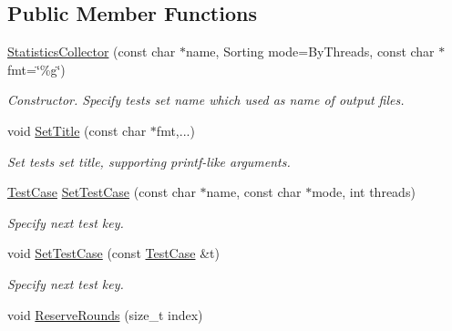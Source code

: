 \subsection*{Public Member Functions}
\begin{DoxyCompactItemize}
\item 
\hypertarget{classStatisticsCollector_af5f25a847e4d03c0cd7cd03b97f6778c}{}\hyperlink{classStatisticsCollector_af5f25a847e4d03c0cd7cd03b97f6778c}{Statistics\+Collector} (const char $\ast$name, Sorting mode=By\+Threads, const char $\ast$fmt=\char`\"{}\%g\char`\"{})\label{classStatisticsCollector_af5f25a847e4d03c0cd7cd03b97f6778c}

\begin{DoxyCompactList}\small\item\em Constructor. Specify tests set name which used as name of output files. \end{DoxyCompactList}\item 
\hypertarget{classStatisticsCollector_a3c262e769c1bc2a29e217aeae3f9efd3}{}void \hyperlink{classStatisticsCollector_a3c262e769c1bc2a29e217aeae3f9efd3}{Set\+Title} (const char $\ast$fmt,...)\label{classStatisticsCollector_a3c262e769c1bc2a29e217aeae3f9efd3}

\begin{DoxyCompactList}\small\item\em Set tests set title, supporting printf-\/like arguments. \end{DoxyCompactList}\item 
\hypertarget{classStatisticsCollector_acf3b8522b9985f8c08653664cb41a1c7}{}\hyperlink{structStatisticsCollector_1_1TestCase}{Test\+Case} \hyperlink{classStatisticsCollector_acf3b8522b9985f8c08653664cb41a1c7}{Set\+Test\+Case} (const char $\ast$name, const char $\ast$mode, int threads)\label{classStatisticsCollector_acf3b8522b9985f8c08653664cb41a1c7}

\begin{DoxyCompactList}\small\item\em Specify next test key. \end{DoxyCompactList}\item 
\hypertarget{classStatisticsCollector_adcd57703733a4371fcbb7585aad83eb8}{}void \hyperlink{classStatisticsCollector_adcd57703733a4371fcbb7585aad83eb8}{Set\+Test\+Case} (const \hyperlink{structStatisticsCollector_1_1TestCase}{Test\+Case} \&t)\label{classStatisticsCollector_adcd57703733a4371fcbb7585aad83eb8}

\begin{DoxyCompactList}\small\item\em Specify next test key. \end{DoxyCompactList}\item 
\hypertarget{classStatisticsCollector_ad48780ab19408f0009c69fd6c6a5f876}{}void \hyperlink{classStatisticsCollector_ad48780ab19408f0009c69fd6c6a5f876}{Reserve\+Rounds} (size\+\_\+t index)\label{classStatisticsCollector_ad48780ab19408f0009c69fd6c6a5f876}


\end{DoxyCompactItemize}
